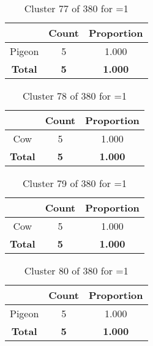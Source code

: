 \begin{table}[ht!]
\centering
\begin{tabular}{|c|c|c|}
\hline
\bf \Spec{} &\bf Count &\bf Proportion\\ \hline \hline
Pigeon & 5 & 1.000\\ \hline
\hline
\bf Total & \bf 5 & \bf 1.000\\ \hline
\end{tabular}
\label{tab:cluster:77:1}
\caption{Cluster 77 of 380 for \minneigh{}=1}
\end{table}

\begin{table}[ht!]
\centering
\begin{tabular}{|c|c|c|}
\hline
\bf \Spec{} &\bf Count &\bf Proportion\\ \hline \hline
Cow & 5 & 1.000\\ \hline
\hline
\bf Total & \bf 5 & \bf 1.000\\ \hline
\end{tabular}
\label{tab:cluster:78:1}
\caption{Cluster 78 of 380 for \minneigh{}=1}
\end{table}

\begin{table}[ht!]
\centering
\begin{tabular}{|c|c|c|}
\hline
\bf \Spec{} &\bf Count &\bf Proportion\\ \hline \hline
Cow & 5 & 1.000\\ \hline
\hline
\bf Total & \bf 5 & \bf 1.000\\ \hline
\end{tabular}
\label{tab:cluster:79:1}
\caption{Cluster 79 of 380 for \minneigh{}=1}
\end{table}

\clearpage
\begin{table}[ht!]
\centering
\begin{tabular}{|c|c|c|}
\hline
\bf \Spec{} &\bf Count &\bf Proportion\\ \hline \hline
Pigeon & 5 & 1.000\\ \hline
\hline
\bf Total & \bf 5 & \bf 1.000\\ \hline
\end{tabular}
\label{tab:cluster:80:1}
\caption{Cluster 80 of 380 for \minneigh{}=1}
\end{table}

